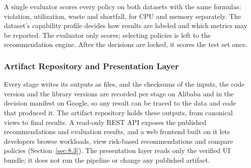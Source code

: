 A single evaluator scores every policy on both datasets with the same formulas: violation, utilization, waste and shortfall, for CPU and memory separately. The dataset's capability profile decides how results are labeled and which metrics may be reported. The evaluator only scores; selecting policies is left to the recommendation engine. After the decisions are locked, it scores the test set once.

\subsubsection{Artifact Repository and Presentation Layer}\label{sec:2.2.6}

Every stage writes its outputs as files, and the checksums of the inputs, the code version and the library versions are recorded per stage on Alibaba and in the decision manifest on Google, so any result can be traced to the data and code that produced it. The artifact repository holds these outputs, from canonical views to final results. A read-only REST API exposes the published recommendations and evaluation results, and a web frontend built on it lets developers browse workloads, view risk-based recommendations and compare policies (Section~\ref{sec:8.3}). The presentation layer reads only the verified UI bundle; it does not run the pipeline or change any published artifact.
